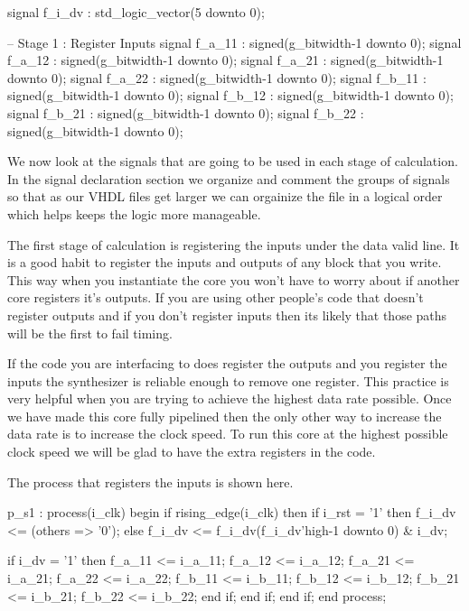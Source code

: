 \begin{VHDLlisting}[tabsize=2]
signal f_i_dv : std_logic_vector(5 downto 0);

-- Stage 1 : Register Inputs
signal f_a_11 : signed(g_bitwidth-1 downto 0);
signal f_a_12 : signed(g_bitwidth-1 downto 0);
signal f_a_21 : signed(g_bitwidth-1 downto 0);
signal f_a_22 : signed(g_bitwidth-1 downto 0);
signal f_b_11 : signed(g_bitwidth-1 downto 0);
signal f_b_12 : signed(g_bitwidth-1 downto 0);
signal f_b_21 : signed(g_bitwidth-1 downto 0);
signal f_b_22 : signed(g_bitwidth-1 downto 0);
\end{VHDLlisting}

We now look at the signals that are going to be used in each stage of calculation. In the signal declaration section we organize and comment the groups of signals so that as our \ac{VHDL} files get larger we can orgainize the file in a logical order which helps keeps the logic more manageable. 

The first stage of calculation is registering the inputs under the data valid line. It is a good habit to register the inputs and outputs of any block that you write. This way when you instantiate the core you won't have to worry about if another core registers it's outputs. If you are using other people's code that doesn't register outputs and if you don't register inputs then its likely that those paths will be the first to fail timing. 

If the code you are interfacing to does register the outputs and you register the inputs the synthesizer is reliable enough to remove one register. This practice is very helpful when you are trying to achieve the highest data rate possible. Once we have made this core fully pipelined then the only other way to increase the data rate is to increase the clock speed. To run this core at the highest possible clock speed we will be glad to have the extra registers in the code. 

The process that registers the inputs is shown here. 

\begin{VHDLlisting}[tabsize=2]
p_s1 : process(i_clk)
	begin
		if rising_edge(i_clk) then
			if i_rst = '1' then
				f_i_dv <= (others => '0');
			else
				f_i_dv <= f_i_dv(f_i_dv'high-1 downto 0) & i_dv;
				
				if i_dv = '1' then
					f_a_11  <= i_a_11;
				    f_a_12  <= i_a_12;
				    f_a_21  <= i_a_21;
				    f_a_22  <= i_a_22;
				    f_b_11  <= i_b_11;
				    f_b_12  <= i_b_12;
				    f_b_21  <= i_b_21;
				    f_b_22  <= i_b_22;
				end if;
			end if;
		end if;
	end process;
\end{VHDLlisting}

